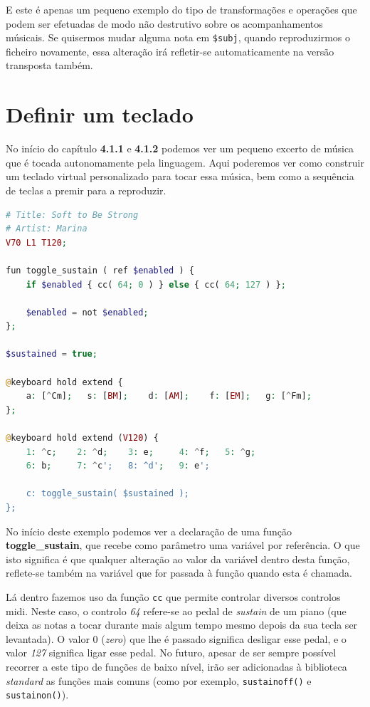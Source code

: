 E este é apenas um pequeno exemplo do tipo de transformações e operações que podem ser efetuadas de modo não destrutivo sobre os acompanhamentos músicais. Se quisermos mudar alguma nota em \texttt{\$subj}, quando reproduzirmos o ficheiro novamente, essa alteração irá refletir-se automaticamente na versão transposta também.

\section{Definir um teclado}

No início do capítulo \textbf{4.1.1} e \textbf{4.1.2} podemos ver um pequeno excerto de música que é tocada autonomamente pela linguagem. Aqui poderemos ver como construir um teclado virtual personalizado para tocar essa música, bem como a sequência de teclas a premir para a reproduzir.
    
\begin{lstlisting}[caption=Exemplo da sintaxe para criação de teclados,language=PHP]
# Title: Soft to Be Strong
# Artist: Marina
V70 L1 T120;

fun toggle_sustain ( ref $enabled ) {
    if $enabled { cc( 64; 0 ) } else { cc( 64; 127 ) };

    $enabled = not $enabled;
};

$sustained = true;

@keyboard hold extend {
    a: [^Cm];   s: [BM];    d: [AM];    f: [EM];   g: [^Fm];
};

@keyboard hold extend (V120) {
    1: ^c;    2: ^d;    3: e;     4: ^f;   5: ^g;
    6: b;     7: ^c';   8: ^d';   9: e';

    c: toggle_sustain( $sustained );
};
\end{lstlisting}

No início deste exemplo podemos ver a declaração de uma função \textbf{toggle\_sustain}, que recebe como parâmetro uma variável por referência. O que isto significa é que qualquer alteração ao valor da variável dentro desta função, reflete-se também na variável que for passada à função quando esta é chamada. 

Lá dentro fazemos uso da função \texttt{cc} que permite controlar diversos controlos \acrshort{midi}. Neste caso, o controlo \textit{64} refere-se ao pedal de \textit{sustain} de um piano (que deixa as notas a tocar durante mais algum tempo mesmo depois da sua tecla ser levantada). O valor 0 (\textit{zero}) que lhe é passado significa desligar esse pedal, e o valor \textit{127} significa ligar esse pedal. No futuro, apesar de ser sempre possível recorrer a este tipo de funções de baixo nível, irão ser adicionadas à biblioteca \textit{standard} as funções mais comuns (como por exemplo, \texttt{sustainoff()} e \texttt{sustainon()}).

